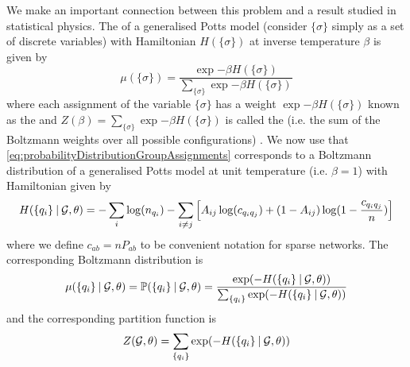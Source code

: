 We make an important connection between this problem and a result studied in statistical physics.
The  of a generalised Potts model (consider $\{ \sigma \}$ simply as a set of discrete variables) with Hamiltonian $H(\{ \sigma \})$ at inverse temperature $\beta$ is given by
\begin{equation}
	\label{eq:boltzmannDistributionPottsModel}
	\mu(\{ \sigma \}) = \frac{\exp{- \beta H(\{ \sigma \})}}{\sum_{\{ \sigma \}} \exp{- \beta H(\{ \sigma \})}}
\end{equation}
where each assignment of the variable $\{ \sigma \}$ has a weight $\exp{- \beta H(\{ \sigma \})}$ known as the  and $Z(\beta) = \sum_{\{ \sigma \}} \exp{- \beta H(\{ \sigma \})}$ is called the  (i.e. the sum of the Boltzmann weights over all possible configurations) \cite{Pru14a,Pru14b,Sus}.
We now use that \cref{eq:probabilityDistributionGroupAssignments} corresponds to a Boltzmann distribution of a generalised Potts model at unit temperature (i.e. $\beta = 1$) with Hamiltonian given by
\begin{equation}
	\label{eq:hamiltonianDistributionGroupAssignments}
	H(\{ q_{i} \} \:\lvert\: \mathcal G, \theta) = - \sum_{i} \log(n_{q_{i}}) - \sum_{i \neq j} \left[ A_{ij} \log(c_{q_{i}q_{j}}) + (1-A_{ij}) \log(1 - \frac{c_{q_{i}q_{j}}}{n}) \right]
\end{equation}
where we define $c_{ab} = n P_{ab}$ to be convenient notation for sparse networks.
The corresponding Boltzmann distribution is
\begin{equation}
	\label{eq:boltzmannDistributionGroupAssignments}
	\mu(\{q_{i}\} \given \graphvar{G}, \theta) = \probability{\{q_{i}\} \given \graphvar{G},\theta}  = \frac{\exp{- H(\{q_{i}\} \given \graphvar{G}, \theta)}}{\sum_{\{q_{i}\}} \exp{- H(\{q_{i}\} \given \graphvar{G}, \theta)}}
\end{equation}
and the corresponding partition function is
\begin{equation}
	\label{eq:partitionFunctionGroupAssignments}
	Z(\graphvar{G}, \theta) = \sum_{\{q_{i}\}} \exp{- H(\{q_{i}\} \given \graphvar{G}, \theta)}
\end{equation}

